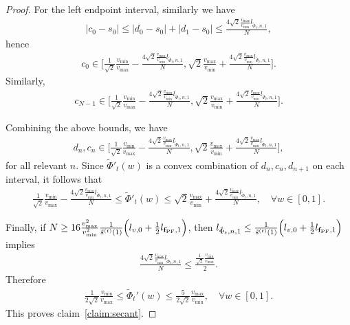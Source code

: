 \documentclass{article}
\newcommand{\fPF}{{\mathbf{f}_{\rm PF}}}
\newcommand{\Farc}{\Phi}
\begin{document}
\begin{proof}
For the left endpoint interval, similarly we have
\begin{align}
|c_0-s_0|
\le 
|d_0-s_0|+|d_1-s_0|
\le
\frac{4 \sqrt{2}\frac{v_{\max}}{v_{\min}}l_{\tilde \Farc_t,n,1}}{N},
\end{align}
hence
\begin{align}
c_0\in 
\Big[\frac{1}{\sqrt2}\frac{v_{\min}}{v_{\max}}-\frac{4 \sqrt{2}\frac{v_{\max}}{v_{\min}}l_{\tilde \Farc_t,n,1}}{N}, \sqrt2\frac{v_{\max}}{v_{\min}}+\frac{4 \sqrt{2}\frac{v_{\max}}{v_{\min}}l_{\tilde \Farc_t,n,1}}{N}\Big].
\end{align}
Similarly,
\begin{align}
c_{N-1}\in
\Big[\frac{1}{\sqrt2}\frac{v_{\min}}{v_{\max}}-\frac{4 \sqrt{2}\frac{v_{\max}}{v_{\min}}l_{\tilde \Farc_t,n,1}}{N}, \sqrt2\frac{v_{\max}}{v_{\min}}+\frac{4 \sqrt{2}\frac{v_{\max}}{v_{\min}}l_{\tilde \Farc_t,n,1}}{N}\Big].
\end{align}

Combining the above bounds, we have
\begin{align}
d_n, c_n \in\Big[\frac{1}{\sqrt2}\frac{v_{\min}}{v_{\max}}-\frac{4 \sqrt{2}\frac{v_{\max}}{v_{\min}}l_{\tilde \Farc_t,n,1}}{N}, \sqrt2\frac{v_{\max}}{v_{\min}}+\frac{4 \sqrt{2}\frac{v_{\max}}{v_{\min}}l_{\tilde \Farc_t,n,1}}{N}\Big],
\end{align}
for all relevant $n$. Since $\tilde \Farc'_t(w)$ is a convex combination of $d_n,c_n,d_{n+1}$ on each interval,
it follows that
\begin{align}
\frac{1}{\sqrt2}\frac{v_{\min}}{v_{\max}}-\frac{4 \sqrt{2}\frac{v_{\max}}{v_{\min}}l_{\tilde \Farc_t,n,1}}{N}
\le
\tilde \Farc'_t(w)
\le
\sqrt2\frac{v_{\max}}{v_{\min}}+\frac{4 \sqrt{2}\frac{v_{\max}}{v_{\min}}l_{\tilde \Farc_t,n,1}}{N},
\quad \forall w\in[0,1].
\end{align}

Finally, if $N \ge 16 \frac{v_{\max}^2}{v_{\min}^2} \frac{1}{\tilde s^{(t)}(1)}\Bigl(l_{v,0}+\frac12 l_{\fPF,1}\Bigr)$,
then $l_{\tilde \Farc_t,n,1}\le \frac{1}{\tilde s^{(t)}(1)}\Bigl(l_{v,0}+\frac12 l_{\fPF,1}\Bigr)$ implies
\begin{align}
\frac{4 \sqrt{2}\frac{v_{\max}}{v_{\min}}l_{\tilde \Farc_t,n,1}}{N}\le \frac{\frac{1}{\sqrt2}\frac{v_{\min}}{v_{\max}}}{2}.
\end{align}
Therefore
\begin{align}
\frac{1}{2\sqrt2}\frac{v_{\min}}{v_{\max}}
\le \tilde \Farc_t'(w)\le \frac{5}{2\sqrt2}\frac{v_{\max}}{v_{\min}},
\quad \forall w\in[0,1].
\end{align}
This proves claim~\ref{claim:secant}.


\end{proof}
\end{document}

